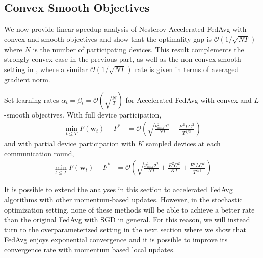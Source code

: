 \subsection{Convex Smooth Objectives}

We now provide linear speedup analysis of Nesterov Accelerated FedAvg
with convex and smooth objectives and show that the optimality gap
is $\mathcal{O}(1/\sqrt{NT})$ where $N$ is the number of participating
devices. This result complements the strongly convex case in the previous
part, as well as the non-convex smooth setting in \cite{huo2020faster,yu2019linear,li2018federated},
where a similar $\mathcal{O}(1/\sqrt{NT})$ rate is given in terms
of averaged gradient norm. 
\begin{theorem}
	\label{thm:Nesterov_cvx}Set learning rates $\alpha_{t}=\beta_{t}=\mathcal{O}(\sqrt{\frac{N}{T}})$
	for Accelerated FedAvg with convex and $L$-smooth objectives. With
	full device participation, 
	\begin{align*}
	\min_{t\leq T}F(\overline{\mathbf{w}}_{t})-F^{\ast} & =\mathcal{O}(\sqrt{\frac{\nu_{\max}^{2}\sigma^{2}}{NT}+\frac{E^{2}LG^{2}}{T^{4/3}}})
	\end{align*}
	and with partial device participation with $K$ sampled devices at
	each communication round, 
	\begin{align*}
	\min_{t\leq T}F(\overline{\mathbf{w}}_{t})-F^{\ast} & =\mathcal{O}(\sqrt{\frac{\nu_{\max}^{2}\sigma^{2}}{NT}+\frac{E^{2}G^{2}}{KT}+\frac{E^{2}LG^{2}}{T^{4/3}}})
	\end{align*}
\end{theorem}
%
\begin{remark}
	It is possible to extend the analyses in this section to accelerated
	FedAvg algorithms with other momentum-based updates. However, in the
	stochastic optimization setting, none of these methods will be able
	to achieve a better rate than the original FedAvg with SGD in general.
	For this reason, we will instead turn to the overparameterized setting
	\cite{ma2017power,liu2018accelerating,canziani2016analysis} in the
	next section where we show that FedAvg enjoys exponential convergence
	and it is possible to improve its convergence rate with momentum based
	local updates. 
\end{remark}